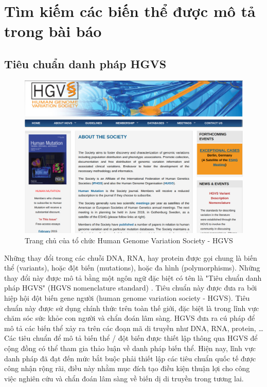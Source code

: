\documentclass[../DoAn.tex]{subfiles}
\begin{document}
\section{Tìm kiếm các biến thể được mô tả trong bài báo}
\subsection{Tiêu chuẩn danh pháp HGVS}

\begin{figure}
\centering
\includegraphics[width=1.0\linewidth]{Hinh_ve/HGVShomepage.png}
\caption{Trang chủ của tổ chức Human Genome Variation Society - HGVS}
\label{fig:HGVSHomepage}
\end{figure}
Những thay đổi trong các chuỗi DNA, RNA, hay protein được gọi chung là biến thể (variants), hoặc đột biến (mutations), hoặc đa hình (polymorphisms). Những thay đổi này được mô tả bằng một ngôn ngữ đặc biệt có tên là "Tiêu chuẩn danh pháp HGVS" (HGVS nomenclature standard) \cite{HGVS} . Tiêu chuẩn này được đưa ra bởi hiệp hội đột biến gene người (human genome variation society - HGVS). Tiêu chuẩn này được sử dụng chính thức trên toàn thế giới, đặc biệt là trong lĩnh vực chăm sóc sức khỏe con người và chẩn đoán lâm sàng. HGVS đưa ra cú pháp để mô tả các biến thể xảy ra trên các đoạn mã di truyền như DNA, RNA, protein, \ldots Các tiêu chuẩn để mô tả biến thể / đột biến được thiết lập thông qua HGVS để cộng đồng có thể tham gia thảo luận về danh pháp biến thể. Hiện nay, lĩnh vực danh pháp đã đạt đến mức bắt buộc phải thiết lập các tiêu chuẩn quốc tế được công nhận rộng rãi, điều này nhằm mục đích tạo điều kiện thuận lợi cho công việc nghiên cứu và chẩn đoán lâm sàng về biến dị di truyền trong tương lai.
\end{document}
